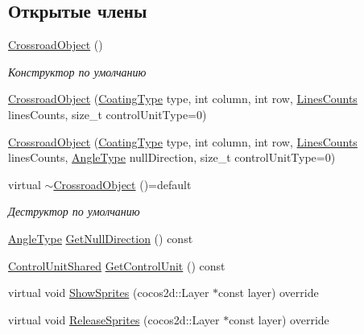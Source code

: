 \subsection*{Открытые члены}
\begin{DoxyCompactItemize}
\item 
\mbox{\label{classrtm_1_1_crossroad_object_a07fd0e5feeca4e6226dd6043ad9175af}} 
\hyperlink{classrtm_1_1_crossroad_object_a07fd0e5feeca4e6226dd6043ad9175af}{Crossroad\+Object} ()
\begin{DoxyCompactList}\small\item\em Конструктор по умолчанию \end{DoxyCompactList}\item 
\hyperlink{classrtm_1_1_crossroad_object_a370ec11e5fd53f2191fb107a8fe2a5d5}{Crossroad\+Object} (\hyperlink{namespacertm_aecd3929e64cd461eb3555b611f6fad95}{Coating\+Type} type, int column, int row, \hyperlink{namespacertm_a14457f3088a92b86a96686b72d3e4eea}{Lines\+Counts} lines\+Counts, size\+\_\+t control\+Unit\+Type=0)
\item 
\hyperlink{classrtm_1_1_crossroad_object_a8a76233b7cff3b017ad67bbf5e11a5d3}{Crossroad\+Object} (\hyperlink{namespacertm_aecd3929e64cd461eb3555b611f6fad95}{Coating\+Type} type, int column, int row, \hyperlink{namespacertm_a14457f3088a92b86a96686b72d3e4eea}{Lines\+Counts} lines\+Counts, \hyperlink{namespacertm_a69dc82b16a0148c10962caa83d930f89}{Angle\+Type} null\+Direction, size\+\_\+t control\+Unit\+Type=0)
\item 
\mbox{\label{classrtm_1_1_crossroad_object_a7e004fc5c59d1fd2b2bea0babcd52abe}} 
virtual \hyperlink{classrtm_1_1_crossroad_object_a7e004fc5c59d1fd2b2bea0babcd52abe}{$\sim$\+Crossroad\+Object} ()=default
\begin{DoxyCompactList}\small\item\em Деструктор по умолчанию \end{DoxyCompactList}\item 
\hyperlink{namespacertm_a69dc82b16a0148c10962caa83d930f89}{Angle\+Type} \hyperlink{classrtm_1_1_crossroad_object_a73d0e929640d8aa804122d8e0ab5e961}{Get\+Null\+Direction} () const
\item 
\hyperlink{namespacertm_a64296d558b2fa02bbf5870afffd61fd9}{Control\+Unit\+Shared} \hyperlink{classrtm_1_1_crossroad_object_a7169a01dc0623fc2701aa184a858be49}{Get\+Control\+Unit} () const
\item 
virtual void \hyperlink{classrtm_1_1_crossroad_object_a2de2a5dac2ba2ca573cfa65a2633de9b}{Show\+Sprites} (cocos2d\+::\+Layer $\ast$const layer) override
\item 
virtual void \hyperlink{classrtm_1_1_crossroad_object_a92e9357697edecc69564fd4d40524a3b}{Release\+Sprites} (cocos2d\+::\+Layer $\ast$const layer) override
\end{DoxyCompactItemize}
